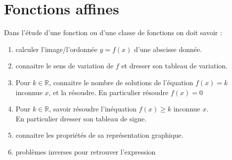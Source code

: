 \documentclass[main.tex]{subfiles}
\begin{document}
 
\cleardoublepage
{}  
\pagestyle{scrheadings} %
\onehalfspacing 
\setcounter{chapter}{5}
 
%	 

\chapter{Fonctions affines}
\noindent Dans l'étude d'une fonction ou d'une classe de fonctions on doit savoir :
	\begin{enumerate}[leftmargin=*,label=\arabic*)]
		\item calculer l'image/l'ordonnée $y=f(x)$ d'une abscisse donnée.
		\item connaitre le sens de variation de $f$ et dresser son tableau de variation.
		\item Pour $k\in\mathbb{R}$, connaitre le nombre de solutions de l'équation $f(x)=k$ inconnue $x$, et la résoudre. 
		En particulier résoudre $f(x)=0$
		\item Pour $k\in\mathbb{R}$, savoir résoudre l'inéquation $f(x)\geqslant k$ inconnue $x$.\\
		En particulier dresser son tableau de signe.
		\item connaitre les propriétés de sa représentation graphique. 
		\item problèmes inverses pour retrouver l'expression 
	\end{enumerate}
\vspace{-1em}
\end{document}
